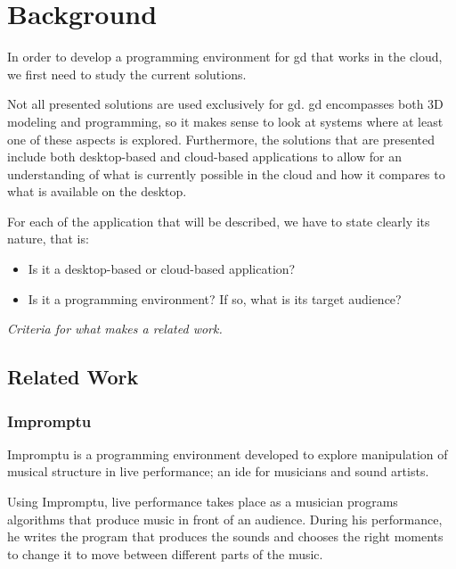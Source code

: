 
\chapter{Background}
\label{chapter:background}
In order to develop a programming environment for \gls{gd} that works in the cloud, we first need to study the current solutions.

Not all presented solutions are used exclusively for \gls{gd}.
\gls{gd} encompasses both 3D modeling and programming, so it makes sense to look at systems where at least one of these aspects is explored.
Furthermore, the solutions that are presented include both desktop-based and cloud-based applications to allow for an understanding of what is currently possible in the cloud and how it compares to what is available on the desktop.

For each of the application that will be described, we have to state clearly its nature, that is:
\begin{itemize}
	\item Is it a desktop-based or cloud-based application?
	\item Is it a programming environment? If so, what is its target audience?
\end{itemize}

{\it Criteria for what makes a related work.}

\section{Related Work}


\subsection{Impromptu}
\label{section:impromptu:related}
Impromptu\cite{sorensen2005impromptu,sorensen2010programming} is a programming environment developed to explore manipulation of musical structure in live performance; an \gls{ide} for musicians and sound artists.

Using Impromptu, live performance takes place as a musician programs algorithms that produce music in front of an audience.
During his performance, he writes the program that produces the sounds and chooses the right moments to change it to move between different parts of the music.

